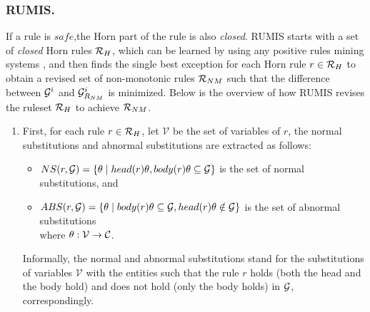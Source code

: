 \subsubsection{RUMIS.} If a rule is $safe$,the Horn part of the rule is also \textit{closed}. RUMIS starts with a set of \textit{closed} Horn rules $\mathcal{R}_H$, which can be learned by using any positive rules mining systems \cite{amie,op,rdf2rules}, and then finds the single best exception for each Horn rule $r \in \mathcal{R}_H$ to obtain a revised set of non-monotonic rules $\mathcal{R}_{NM}$ such that the difference between $\mathcal{G}^i$ and $\mathcal{G}^i_{R_{NM}}$ is minimized. Below is the overview of how RUMIS revises the ruleset $\mathcal{R}_H$ to achieve $\mathcal{R}_{NM}$.
\begin{enumerate}
\item First, for each rule $r \in \mathcal{R}_H$, let $\mathcal{V}$ be the set of variables of $r$, the normal substitutions and abnormal substitutions are extracted as follows:
\begin{itemize}
\item $NS(r, \mathcal{G}) = \{\theta \mid head(r)\theta, body(r)\theta \subseteq \mathcal{G}\}$ is the set of normal substitutions, and
\item $ABS(r, \mathcal{G}) = \{\theta \mid body(r)\theta \subseteq \mathcal{G} , head(r)\theta \notin \mathcal{G}\}$ is the set of abnormal substitutions\\
where $\theta: \mathcal{V} \rightarrow \mathcal{C}$.
\end{itemize}
Informally, the normal and abnormal substitutions stand for the substitutions of variables $\mathcal{V}$ with the entities such that the rule $r$ holds (both the head and the body hold) and does not hold (only the body holds) in $\mathcal{G}$, correspondingly.


\end{enumerate}
